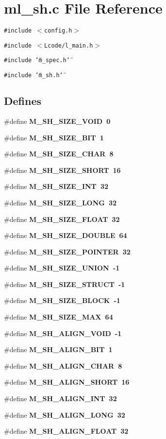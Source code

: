 \section{ml\_\-sh.c File Reference}
\label{ml__sh_8c}
{\tt \#include $<$config.h$>$}\par
{\tt \#include $<$Lcode/l\_\-main.h$>$}\par
{\tt \#include \char`\"{}m\_\-spec.h\char`\"{}}\par
{\tt \#include \char`\"{}m\_\-sh.h\char`\"{}}\par
\subsection*{Defines}
\begin{CompactItemize}
\item 
\#define \bf{M\_\-SH\_\-SIZE\_\-VOID}~0
\item 
\#define \bf{M\_\-SH\_\-SIZE\_\-BIT}~1
\item 
\#define \bf{M\_\-SH\_\-SIZE\_\-CHAR}~8
\item 
\#define \bf{M\_\-SH\_\-SIZE\_\-SHORT}~16
\item 
\#define \bf{M\_\-SH\_\-SIZE\_\-INT}~32
\item 
\#define \bf{M\_\-SH\_\-SIZE\_\-LONG}~32
\item 
\#define \bf{M\_\-SH\_\-SIZE\_\-FLOAT}~32
\item 
\#define \bf{M\_\-SH\_\-SIZE\_\-DOUBLE}~64
\item 
\#define \bf{M\_\-SH\_\-SIZE\_\-POINTER}~32
\item 
\#define \bf{M\_\-SH\_\-SIZE\_\-UNION}~-1
\item 
\#define \bf{M\_\-SH\_\-SIZE\_\-STRUCT}~-1
\item 
\#define \bf{M\_\-SH\_\-SIZE\_\-BLOCK}~-1
\item 
\#define \bf{M\_\-SH\_\-SIZE\_\-MAX}~64
\item 
\#define \bf{M\_\-SH\_\-ALIGN\_\-VOID}~-1
\item 
\#define \bf{M\_\-SH\_\-ALIGN\_\-BIT}~1
\item 
\#define \bf{M\_\-SH\_\-ALIGN\_\-CHAR}~8
\item 
\#define \bf{M\_\-SH\_\-ALIGN\_\-SHORT}~16
\item 
\#define \bf{M\_\-SH\_\-ALIGN\_\-INT}~32
\item 
\#define \bf{M\_\-SH\_\-ALIGN\_\-LONG}~32
\item 
\#define \bf{M\_\-SH\_\-ALIGN\_\-FLOAT}~32
\item 

\end{CompactItemize}

